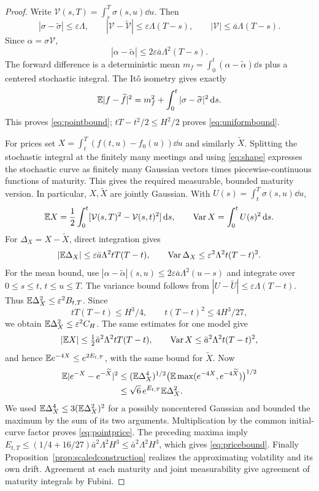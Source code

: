 \begin{proof}
Write $\mathcal V(s,T)=\int_s^T\sigma(s,u)\dd u$. Then
\[
|\sigma-\widetilde\sigma|\le\varepsilon\Lambda,\qquad
|\mathcal V-\widetilde{\mathcal V}|\le\varepsilon\Lambda(T-s),\qquad |\mathcal V|\le\bar a\Lambda(T-s).
\]
Since $\alpha=\sigma \mathcal V$,
\[
|\alpha-\widetilde\alpha|\le2\varepsilon\bar a\Lambda^2(T-s).
\]
The forward difference is a deterministic mean $m_f=\int_0^t(\alpha-\widetilde\alpha)\dd s$ plus a centered stochastic integral. The It\^o isometry gives exactly
\[
\mathbb E|f-\widetilde f|^2=m_f^2+\int_0^t|\sigma-\widetilde\sigma|^2\,\mathrm d s.
\]
This proves \eqref{eq:pointbound}; $tT-t^2/2\le H^2/2$ proves \eqref{eq:uniformbound}.

For prices set $X=\int_t^T(f(t,u)-f_0(u))\dd u$ and similarly $\widetilde X$. Splitting the stochastic integral at the finitely many meetings and using \eqref{eq:shape} expresses the stochastic curve as finitely many Gaussian vectors times piecewise-continuous functions of maturity. This gives the required measurable, bounded maturity version. In particular, $X,\widetilde X$ are jointly Gaussian. With $U(s)=\int_t^T\sigma(s,u)\dd u$,
\[
\mathbb E X=\frac12\int_0^t[\mathcal V(s,T)^2-\mathcal V(s,t)^2]\,\mathrm d s,\qquad
\operatorname{Var} X=\int_0^t U(s)^2\,\mathrm d s.
\]
For $\Delta_X=X-\widetilde X$, direct integration gives
\[
|\mathbb E \Delta_X|\le\varepsilon\bar a\Lambda^2tT(T-t),\qquad
\operatorname{Var} \Delta_X\le\varepsilon^2\Lambda^2t(T-t)^2.
\]
For the mean bound, use
$|\alpha-\widetilde\alpha|(s,u)\le2\varepsilon\bar a\Lambda^2(u-s)$ and integrate over $0\le s\le t$, $t\le u\le T$. The variance bound follows from $|U-\widetilde U|\le\varepsilon\Lambda(T-t)$. Thus $\mathbb E \Delta_X^2\le\varepsilon^2B_{t,T}$. Since
\[
tT(T-t)\le H^3/4,\qquad t(T-t)^2\le4H^3/27,
\]
we obtain $\mathbb E \Delta_X^2\le\varepsilon^2C_H$. The same estimates for one model give
\[
|\mathbb E X|\le\tfrac12\bar a^2\Lambda^2tT(T-t),\qquad
\operatorname{Var} X\le\bar a^2\Lambda^2t(T-t)^2,
\]
and hence $\mathbb E e^{-4X}\le e^{2E_{t,T}}$, with the same bound for $\widetilde X$. Now
\begin{align*}
\mathbb E|e^{-X}-e^{-\widetilde X}|^2
&\le (\mathbb E \Delta_X^4)^{1/2}
\bigl(\mathbb E\max(e^{-4X},e^{-4\widetilde X})\bigr)^{1/2}\\
&\le\sqrt6\,e^{E_{t,T}}\mathbb E \Delta_X^2.
\end{align*}
We used $\mathbb E \Delta_X^4\le3(\mathbb E \Delta_X^2)^2$ for a possibly noncentered Gaussian and bounded the maximum by the sum of its two arguments. Multiplication by the common initial-curve factor proves \eqref{eq:pointprice}. The preceding maxima imply $E_{t,T}\le(1/4+16/27)\bar a^2\Lambda^2H^3\le\bar a^2\Lambda^2H^3$, which gives \eqref{eq:pricebound}. Finally Proposition~\ref{prop:scaledconstruction} realizes the approximating volatility and its own drift. Agreement at each maturity and joint measurability give agreement of maturity integrals by Fubini.
\end{proof}

